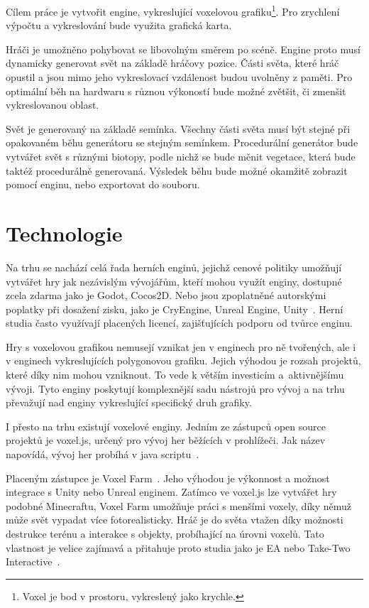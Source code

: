 \documentclass[thesis=M,czech]{FITthesis}[2019/12/23]
\begin{document}
Cílem práce je vytvořit engine, vykreslující voxelovou grafiku\footnote{Voxel je bod v prostoru, vykreslený jako krychle.}. Pro zrychlení výpočtu a vykreslování bude využita grafická karta.

Hráči je umožněno pohybovat se libovolným směrem po scéně. Engine proto musí dynamicky generovat svět na základě hráčovy pozice. Části světa, které hráč opustil a jsou mimo jeho vykreslovací vzdálenost budou uvolněny z paměti. Pro optimální běh na hardwaru s různou výkoností bude možné zvětšit, či zmenšit vykreslovanou oblast.

Svět je generovaný na základě semínka. Všechny části světa musí být stejné při opakovaném běhu generátoru se stejným semínkem. Procedurální generátor bude vytvářet svět s různými biotopy, podle nichž se bude měnit vegetace, která bude taktéž procedurálně generovaná. Výsledek běhu bude možné okamžitě zobrazit pomocí enginu, nebo exportovat do souboru.


\chapter{Technologie}

Na trhu se nachází celá řada herních enginů, jejichž cenové politiky umožňují vytvářet hry jak nezávislým vývojářům, kteří mohou využít enginy, dostupné zcela zdarma jako je Godot, Cocos2D. Nebo jsou zpoplatněné autorskými poplatky při dosažení zisku, jako je CryEngine, Unreal Engine, Unity~\cite{engines}. Herní studia často využívají placených licencí, zajišťujících podporu od tvůrce enginu.

Hry s voxelovou grafikou nemusejí vznikat jen v enginech pro ně tvořených, ale i v enginech vykreslujících polygonovou grafiku. Jejich výhodou je rozsah projektů, které díky nim mohou vzniknout. To vede k větším investicím a~aktivnějšímu vývoji. Tyto enginy poskytují komplexnější sadu nástrojů pro vývoj a na trhu převažují nad enginy vykreslující specifický druh grafiky.

I přesto na trhu existují voxelové enginy. Jedním ze zástupců open source projektů je voxel.js, určený pro vývoj her běžících v prohlížeči. Jak název napovídá, vývoj her probíhá v java scriptu~\cite{voxel_js}.

Placeným zástupce je Voxel Farm~\cite{voxel_farm}. Jeho výhodou je výkonnost a možnost integrace s Unity nebo Unreal enginem. Zatímco ve voxel.js lze vytvářet hry podobné Minecraftu, Voxel Farm umožňuje práci s menšími voxely, díky němuž může svět vypadat více fotorealisticky. Hráč je do světa vtažen díky možnosti destrukce terénu a interakce s objekty, probíhající na úrovni voxelů. Tato vlastnost je velice zajímavá a přitahuje proto studia jako je EA nebo Take-Two Interactive~\cite{voxel_engines}.
\end{document}
